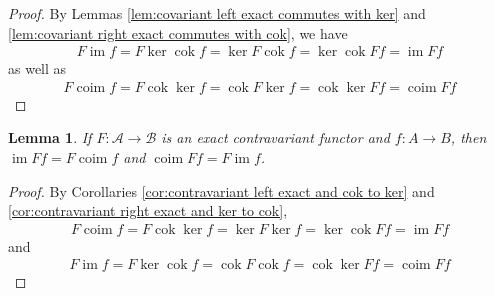 \documentclass{article}
\newcommand{\fA}{\mathscr{A}}
\newcommand{\fB}{\mathscr{B}}
\DeclareMathOperator{\im}{\mathrm{im}}
\DeclareMathOperator{\coim}{\mathrm{coim}}
\DeclareMathOperator{\cok}{\mathrm{cok}}
\newtheorem{lemma}[theorem]{Lemma}
\begin{document}
\begin{proof}
    By Lemmas \ref{lem:covariant left exact commutes with ker} and \ref{lem:covariant right exact commutes with cok}, we have
    \begin{align*}
        F\im f=F\ker \cok f=\ker F\cok f=\ker \cok Ff=\im Ff
    \end{align*}
    as well as
    \begin{align*}
        F\coim f=F\cok \ker f=\cok F\ker f=\cok \ker Ff=\coim Ff
    \end{align*}
\end{proof}
\begin{lemma}\label{lem:contravariant exact and im to coim and coim to im}
     If $F:\fA \to \fB$ is an exact contravariant functor and $f:A\to B$, then $\im Ff=F\coim f$ and $\coim Ff=F\im f$.
\end{lemma}
\begin{proof}
    By Corollaries \ref{cor:contravariant left exact and cok to ker} and \ref{cor:contravariant right exact and ker to cok},
    \begin{align*}
        F\coim f=F\cok \ker f=\ker F\ker f=\ker \cok Ff=\im Ff
    \end{align*}
    and
    \begin{align*}
        F\im f=F\ker \cok f=\cok F\cok f=\cok \ker Ff=\coim Ff
    \end{align*}
\end{proof}
\end{document}
